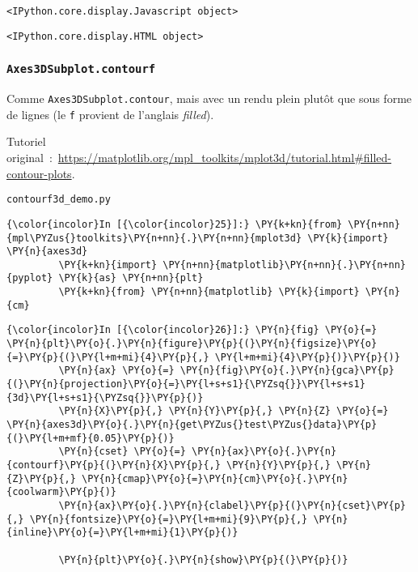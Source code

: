     
    \begin{verbatim}
<IPython.core.display.Javascript object>
    \end{verbatim}

    
    
    \begin{verbatim}
<IPython.core.display.HTML object>
    \end{verbatim}

    
    \hypertarget{axes3dsubplot.contourf}{%
\subsubsection{\texorpdfstring{\texttt{Axes3DSubplot.contourf}}{Axes3DSubplot.contourf}}\label{axes3dsubplot.contourf}}

    Comme \texttt{Axes3DSubplot.contour}, mais avec un rendu plein plutôt
que sous forme de lignes (le \texttt{f} provient de l'anglais
\emph{filled}).

    Tutoriel
original~:~\url{https://matplotlib.org/mpl_toolkits/mplot3d/tutorial.html\#filled-contour-plots}.

    \texttt{contourf3d\_demo.py}

    \begin{Verbatim}[commandchars=\\\{\}]
{\color{incolor}In [{\color{incolor}25}]:} \PY{k+kn}{from} \PY{n+nn}{mpl\PYZus{}toolkits}\PY{n+nn}{.}\PY{n+nn}{mplot3d} \PY{k}{import} \PY{n}{axes3d}
         \PY{k+kn}{import} \PY{n+nn}{matplotlib}\PY{n+nn}{.}\PY{n+nn}{pyplot} \PY{k}{as} \PY{n+nn}{plt}
         \PY{k+kn}{from} \PY{n+nn}{matplotlib} \PY{k}{import} \PY{n}{cm}
\end{Verbatim}


    \begin{Verbatim}[commandchars=\\\{\}]
{\color{incolor}In [{\color{incolor}26}]:} \PY{n}{fig} \PY{o}{=} \PY{n}{plt}\PY{o}{.}\PY{n}{figure}\PY{p}{(}\PY{n}{figsize}\PY{o}{=}\PY{p}{(}\PY{l+m+mi}{4}\PY{p}{,} \PY{l+m+mi}{4}\PY{p}{)}\PY{p}{)}
         \PY{n}{ax} \PY{o}{=} \PY{n}{fig}\PY{o}{.}\PY{n}{gca}\PY{p}{(}\PY{n}{projection}\PY{o}{=}\PY{l+s+s1}{\PYZsq{}}\PY{l+s+s1}{3d}\PY{l+s+s1}{\PYZsq{}}\PY{p}{)}
         \PY{n}{X}\PY{p}{,} \PY{n}{Y}\PY{p}{,} \PY{n}{Z} \PY{o}{=} \PY{n}{axes3d}\PY{o}{.}\PY{n}{get\PYZus{}test\PYZus{}data}\PY{p}{(}\PY{l+m+mf}{0.05}\PY{p}{)}
         \PY{n}{cset} \PY{o}{=} \PY{n}{ax}\PY{o}{.}\PY{n}{contourf}\PY{p}{(}\PY{n}{X}\PY{p}{,} \PY{n}{Y}\PY{p}{,} \PY{n}{Z}\PY{p}{,} \PY{n}{cmap}\PY{o}{=}\PY{n}{cm}\PY{o}{.}\PY{n}{coolwarm}\PY{p}{)}
         \PY{n}{ax}\PY{o}{.}\PY{n}{clabel}\PY{p}{(}\PY{n}{cset}\PY{p}{,} \PY{n}{fontsize}\PY{o}{=}\PY{l+m+mi}{9}\PY{p}{,} \PY{n}{inline}\PY{o}{=}\PY{l+m+mi}{1}\PY{p}{)}
         
         \PY{n}{plt}\PY{o}{.}\PY{n}{show}\PY{p}{(}\PY{p}{)}
\end{Verbatim}



